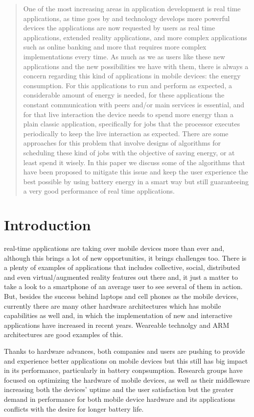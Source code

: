 \documentclass[10pt,article]{IEEEtran}
\begin{document}
\begin{abstract}
One of the most increasing areas in application development is real time applications, as time goes by and technology develops more powerful devices the applications are now requested by users as real time applications, extended reality applications, and more complex applications such as online banking and more that requires more complex implementations every time. As much as we as users like these new applications and the new possibilities we have with them, there is always a concern regarding this kind of applications in mobile devices: the energy consumption. For this applications to run and perform as expected, a considerable amount of energy is needed, for these applications the constant communication with peers and/or main services is essential, and for that live interaction the device needs to spend more energy than a plain classic application, specifically for jobs that the processor executes periodically to keep the live interaction as expected. There are some approaches for this problem that involve designs of algorithms for scheduling these kind of jobs with the objective of saving energy, or at least spend it wisely. In this paper we discuss some of the algorithms that have been proposed to mitigate this issue and keep the user experience the best possible by using battery energy in a smart way but still guaranteeing a very good performance of real time applications.

\end{abstract}

\section{Introduction}
 real-time applications are taking over mobile devices more than ever and, although this brings a lot of new opportunities, it brings challenges too. There is a plenty of examples of applications that includes collective, social, distributed and even virtual/augmented reality features out there and, it just a matter to take a look to a smartphone of an average user to see several of them in action. But, besides the success behind laptops and cell phones as the mobile devices, currently there are many other hardware architectures which has mobile capabilities as well and, in which the implementation of new and interactive applications have increased in recent years. Weareable technolgy and ARM architectures are good examples of this.

Thanks to hardware advances, both companies and users are pushing to provide and experience better applications on mobile devices but this still has big impact in its performance, particularly in battery conpsumption. Research groups have focused on optimizing the hardware of mobile devices, as well as their middleware increasing both the devices' uptime and the user satisfaction but the greater demand in performance for both mobile device hardware and its applications conflicts with the desire for longer battery life. 
\end{document}
